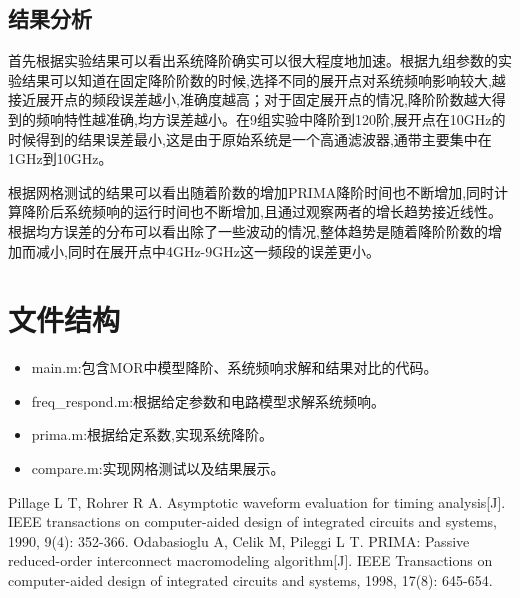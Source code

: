 \documentclass[12pt]{article}
\begin{document}
\begin{sloppypar}
\subsection{结果分析}
\qquad 首先根据实验结果可以看出系统降阶确实可以很大程度地加速。根据九组参数的实验结果可以知道在固定降阶阶数的时候,选择不同的展开点对系统频响影响较大,越接近展开点的频段误差越小,准确度越高；对于固定展开点的情况,降阶阶数越大得到的频响特性越准确,均方误差越小。在9组实验中降阶到120阶,展开点在10GHz的时候得到的结果误差最小,这是由于原始系统是一个高通滤波器,通带主要集中在1GHz到10GHz。

\qquad 根据网格测试的结果可以看出随着阶数的增加PRIMA降阶时间也不断增加,同时计算降阶后系统频响的运行时间也不断增加,且通过观察两者的增长趋势接近线性。根据均方误差的分布可以看出除了一些波动的情况,整体趋势是随着降阶阶数的增加而减小,同时在展开点中4GHz-9GHz这一频段的误差更小。


\section{文件结构}
\begin{itemize}
  \item main.m:包含MOR中模型降阶、系统频响求解和结果对比的代码。
  \item freq\_respond.m:根据给定参数和电路模型求解系统频响。
  \item prima.m:根据给定系数,实现系统降阶。
  \item compare.m:实现网格测试以及结果展示。
\end{itemize}

\end{sloppypar}
\begin{thebibliography}{99}  

  Pillage L T, Rohrer R A. Asymptotic waveform evaluation for timing analysis[J]. IEEE transactions on computer-aided design of integrated circuits and systems, 1990, 9(4): 352-366.
  Odabasioglu A, Celik M, Pileggi L T. PRIMA: Passive reduced-order interconnect macromodeling algorithm[J]. IEEE Transactions on computer-aided design of integrated circuits and systems, 1998, 17(8): 645-654.
  \end{thebibliography}
\end{document}
